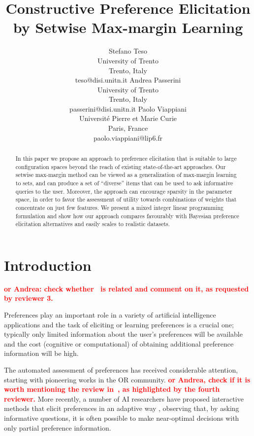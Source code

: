 \documentclass{article}
\title{Constructive Preference Elicitation by Setwise Max-margin Learning}
\author{Stefano Teso \\
University of Trento \\
Trento, Italy \\
teso@disi.unitn.it
\And
Andrea Passerini \\
University of Trento \\
Trento, Italy \\
passerini@disi.unitn.it
\And
Paolo Viappiani \\
Universit\'e Pierre et Marie Curie \\
Paris, France \\
paolo.viappiani@lip6.fr}
\renewcommand\[{\begin{equation}}
\renewcommand\]{\end{equation}}
\newcommand{\paolo}[1]{{\bf \textcolor{red}{{\fbox{Paolo:} #1}}}}
\begin{document}
\maketitle

\begin{abstract}
  In this paper we propose an approach to preference elicitation that
  is suitable to large configuration spaces beyond the reach of
  existing state-of-the-art approaches. Our setwise max-margin method
  can be viewed as a generalization of max-margin learning to sets,
  and can produce a set of ``diverse'' items that can be used to ask
  informative queries to the user.  Moreover, the approach can
  encourage sparsity in the parameter space, in order to favor the
  assessment of utility towards combinations of weights that
  concentrate on just few features.  We present a mixed integer linear
  programming formulation and show how our approach compares
  favourably with Bayesian preference elicitation alternatives and
  easily scales to realistic datasets.
\end{abstract}

\section{Introduction}

\paolo{or Andrea: check whether~\cite{greco2008ordinal} is related and comment
on it, as requested by reviewer 3.}

Preferences \cite{Peintner2008} play an important role in a variety of artificial
intelligence applications and the task of eliciting or learning preferences is a crucial one; 
typically only limited
information about the user's preferences will be available and the
cost (cognitive or computational) of obtaining additional preference information will be high.  

The automated assessment of preferences has received considerable attention,
starting with pioneering works \cite{White1984,jaquetlsiskos1982} in the OR community.
\paolo{or Andrea, check if it is worth mentioning the review in~\cite{jaquetlsiskos2001},
as highlighted by the fourth reviewer.}
More recently, a number of AI researchers have proposed interactive methods that elicit
preferences in an adaptive way
\cite{chajewska2000,boutilier2002,Wang2003,boutilier2006,guo2010real,viappiani2010optimal},
observing that, by asking informative questions, it is often possible to make near-optimal decisions with only partial preference information.
\end{document}
